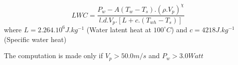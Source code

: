 \[
LWC = \frac{ P_w - A(T_w-T_s).(\rho.V_p)^\chi}
              { l.d.V_p.[ L+c.(T_{wh} - T_s) ] }
\]
where $L = 2.264.10^6 J.kg^{-1}$ (Water latent heat at $100^\circ C$) and
$c = 4218 J.kg^{-1}$ (Specific water heat)

The computation is made only if $V_p > 50.0 m/s$ and $P_w > 3.0 Watt $
